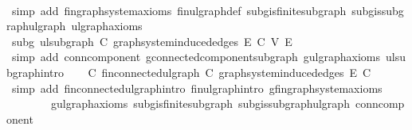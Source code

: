 \begin{isabellebody}
\ \ \ \ \isamarkupfalse%
\ {\isacharparenleft}{\kern0pt}simp\ add{\isacharcolon}{\kern0pt}\ fin{\isacharunderscore}{\kern0pt}graph{\isacharunderscore}{\kern0pt}system{\isacharunderscore}{\kern0pt}axioms\ fin{\isacharunderscore}{\kern0pt}ulgraph{\isacharunderscore}{\kern0pt}def\ subg{\isachardot}{\kern0pt}is{\isacharunderscore}{\kern0pt}finite{\isacharunderscore}{\kern0pt}subgraph\ subg{\isachardot}{\kern0pt}is{\isacharunderscore}{\kern0pt}subgraph{\isacharunderscore}{\kern0pt}ulgraph\ ulgraph{\isacharunderscore}{\kern0pt}axioms{\isacharparenright}{\kern0pt}\isanewline
\ \ \isamarkupfalse%
\ subg{\isacharprime}{\kern0pt}{\isacharcolon}{\kern0pt}\ ulsubgraph\ C\ {\isachardoublequoteopen}graph{\isacharunderscore}{\kern0pt}system{\isachardot}{\kern0pt}induced{\isacharunderscore}{\kern0pt}edges\ E{\isacharprime}{\kern0pt}\ C{\isachardoublequoteclose}\ V{\isacharprime}{\kern0pt}\ E{\isacharprime}{\kern0pt}\isanewline
\ \ \ \ \isamarkupfalse%
\ {\isacharparenleft}{\kern0pt}simp\ add{\isacharcolon}{\kern0pt}\ conn{\isacharunderscore}{\kern0pt}component\ g{\isacharprime}{\kern0pt}{\isachardot}{\kern0pt}connected{\isacharunderscore}{\kern0pt}component{\isacharunderscore}{\kern0pt}subgraph\ g{\isacharprime}{\kern0pt}{\isachardot}{\kern0pt}ulgraph{\isacharunderscore}{\kern0pt}axioms\ ulsubgraph{\isachardot}{\kern0pt}intro{\isacharparenright}{\kern0pt}\isanewline
\ \ \isamarkupfalse%
\ C{\isacharcolon}{\kern0pt}\ fin{\isacharunderscore}{\kern0pt}connected{\isacharunderscore}{\kern0pt}ulgraph\ C\ {\isachardoublequoteopen}graph{\isacharunderscore}{\kern0pt}system{\isachardot}{\kern0pt}induced{\isacharunderscore}{\kern0pt}edges\ E{\isacharprime}{\kern0pt}\ C{\isachardoublequoteclose}\isanewline
\ \ \ \ \isamarkupfalse%
\ {\isacharparenleft}{\kern0pt}simp\ add{\isacharcolon}{\kern0pt}\ fin{\isacharunderscore}{\kern0pt}connected{\isacharunderscore}{\kern0pt}ulgraph{\isachardot}{\kern0pt}intro\ fin{\isacharunderscore}{\kern0pt}ulgraph{\isachardot}{\kern0pt}intro\ g{\isacharprime}{\kern0pt}{\isachardot}{\kern0pt}fin{\isacharunderscore}{\kern0pt}graph{\isacharunderscore}{\kern0pt}system{\isacharunderscore}{\kern0pt}axioms\isanewline
\ \ \ \ \ \ \ \ g{\isacharprime}{\kern0pt}{\isachardot}{\kern0pt}ulgraph{\isacharunderscore}{\kern0pt}axioms\ subg{\isacharprime}{\kern0pt}{\isachardot}{\kern0pt}is{\isacharunderscore}{\kern0pt}finite{\isacharunderscore}{\kern0pt}subgraph\ subg{\isacharprime}{\kern0pt}{\isachardot}{\kern0pt}is{\isacharunderscore}{\kern0pt}subgraph{\isacharunderscore}{\kern0pt}ulgraph\ conn{\isacharunderscore}{\kern0pt}component\isanewline

\end{isabellebody}
